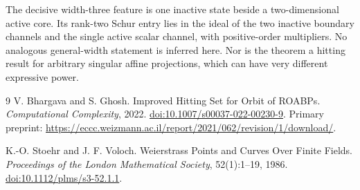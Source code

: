 \documentclass[11pt]{article}
\begin{document}
The decisive width-three feature is one inactive state beside a
two-dimensional active core. Its rank-two Schur entry lies in the ideal
of the two inactive boundary channels and the single active scalar
channel, with positive-order multipliers. No analogous general-width
statement is inferred here. Nor is the theorem a hitting result for
arbitrary singular affine projections, which can have very different
expressive power.

\begin{thebibliography}{9}
V. Bhargava and S. Ghosh.
\newblock Improved Hitting Set for Orbit of ROABPs.
\newblock \emph{Computational Complexity}, 2022.
\newblock \href{https://doi.org/10.1007/s00037-022-00230-9}{doi:10.1007/s00037-022-00230-9}.
\newblock Primary preprint:
\url{https://eccc.weizmann.ac.il/report/2021/062/revision/1/download/}.

K.-O. Stoehr and J. F. Voloch.
\newblock Weierstrass Points and Curves Over Finite Fields.
\newblock \emph{Proceedings of the London Mathematical Society},
52(1):1--19, 1986.
\newblock \href{https://doi.org/10.1112/plms/s3-52.1.1}{doi:10.1112/plms/s3-52.1.1}.
\end{thebibliography}
\end{document}

